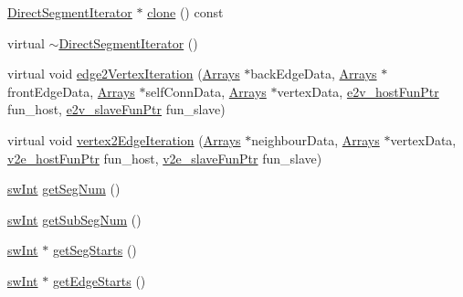 \begin{DoxyCompactItemize}
\item 
\mbox{\hyperlink{classUNAT_1_1DirectSegmentIterator}{Direct\+Segment\+Iterator}} $\ast$ \mbox{\hyperlink{classUNAT_1_1DirectSegmentIterator_a998b5eef5895e387e54811ef3f5ffd84}{clone}} () const
\item 
virtual \mbox{\hyperlink{classUNAT_1_1DirectSegmentIterator_adb1d85d45bb743fbc6585531784ba769}{$\sim$\+Direct\+Segment\+Iterator}} ()
\item 
virtual void \mbox{\hyperlink{classUNAT_1_1DirectSegmentIterator_af7c69ced9c4c68aab3f8be3bdbbb39c4}{edge2\+Vertex\+Iteration}} (\mbox{\hyperlink{structArrays}{Arrays}} $\ast$back\+Edge\+Data, \mbox{\hyperlink{structArrays}{Arrays}} $\ast$front\+Edge\+Data, \mbox{\hyperlink{structArrays}{Arrays}} $\ast$self\+Conn\+Data, \mbox{\hyperlink{structArrays}{Arrays}} $\ast$vertex\+Data, \mbox{\hyperlink{test_2directSegment_2iterator_8h_ae588e578b6781906a44208130df0ab29}{e2v\+\_\+host\+Fun\+Ptr}} fun\+\_\+host, \mbox{\hyperlink{test_2directSegment_2iterator_8h_a7b58029f74760f3ca5384034c0e89c15}{e2v\+\_\+slave\+Fun\+Ptr}} fun\+\_\+slave)
\item 
virtual void \mbox{\hyperlink{classUNAT_1_1DirectSegmentIterator_ac802bc1237356604a14c3349d6bf8d29}{vertex2\+Edge\+Iteration}} (\mbox{\hyperlink{structArrays}{Arrays}} $\ast$neighbour\+Data, \mbox{\hyperlink{structArrays}{Arrays}} $\ast$vertex\+Data, \mbox{\hyperlink{test_2directSegment_2iterator_8h_a15a4eedea7b94460153f0a0924c98224}{v2e\+\_\+host\+Fun\+Ptr}} fun\+\_\+host, \mbox{\hyperlink{test_2directSegment_2iterator_8h_acd8809485e3b16adfce1d459f3372671}{v2e\+\_\+slave\+Fun\+Ptr}} fun\+\_\+slave)
\item 
\mbox{\hyperlink{include_2swMacro_8h_a113cf5f6b5377cdf3fac6aa4e443e9aa}{sw\+Int}} \mbox{\hyperlink{classUNAT_1_1DirectSegmentIterator_a1c5edf64608f43c1bdf9a43ecb2b0b03}{get\+Seg\+Num}} ()
\item 
\mbox{\hyperlink{include_2swMacro_8h_a113cf5f6b5377cdf3fac6aa4e443e9aa}{sw\+Int}} \mbox{\hyperlink{classUNAT_1_1DirectSegmentIterator_a8aced068087f2492ad30376d6cec1294}{get\+Sub\+Seg\+Num}} ()
\item 
\mbox{\hyperlink{include_2swMacro_8h_a113cf5f6b5377cdf3fac6aa4e443e9aa}{sw\+Int}} $\ast$ \mbox{\hyperlink{classUNAT_1_1DirectSegmentIterator_a125018398a70e40dbb02b56316efbf5a}{get\+Seg\+Starts}} ()
\item 
\mbox{\hyperlink{include_2swMacro_8h_a113cf5f6b5377cdf3fac6aa4e443e9aa}{sw\+Int}} $\ast$ \mbox{\hyperlink{classUNAT_1_1DirectSegmentIterator_afd25b37163568da6c2982bd766d346af}{get\+Edge\+Starts}} ()

\end{DoxyCompactItemize}
